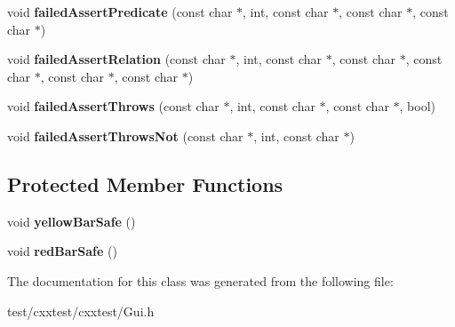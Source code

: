 \begin{DoxyCompactItemize}
\item 
\hypertarget{classCxxTest_1_1GuiListener_ae68ce2f54c5b8f8b9e548ecbebd88e51}{void {\bfseries failed\-Assert\-Predicate} (const char $\ast$, int, const char $\ast$, const char $\ast$, const char $\ast$)}\label{classCxxTest_1_1GuiListener_ae68ce2f54c5b8f8b9e548ecbebd88e51}

\item 
\hypertarget{classCxxTest_1_1GuiListener_a30513fcee80826f4473c5c1bac4d349a}{void {\bfseries failed\-Assert\-Relation} (const char $\ast$, int, const char $\ast$, const char $\ast$, const char $\ast$, const char $\ast$, const char $\ast$)}\label{classCxxTest_1_1GuiListener_a30513fcee80826f4473c5c1bac4d349a}

\item 
\hypertarget{classCxxTest_1_1GuiListener_afb33d69bf7bfed47e7ca30eac1d7485b}{void {\bfseries failed\-Assert\-Throws} (const char $\ast$, int, const char $\ast$, const char $\ast$, bool)}\label{classCxxTest_1_1GuiListener_afb33d69bf7bfed47e7ca30eac1d7485b}

\item 
\hypertarget{classCxxTest_1_1GuiListener_ac70bc31660b653e8d8557ba9febbf5d2}{void {\bfseries failed\-Assert\-Throws\-Not} (const char $\ast$, int, const char $\ast$)}\label{classCxxTest_1_1GuiListener_ac70bc31660b653e8d8557ba9febbf5d2}

\end{DoxyCompactItemize}
\subsection*{Protected Member Functions}
\begin{DoxyCompactItemize}
\item 
\hypertarget{classCxxTest_1_1GuiListener_aa4ca06d3a9cf402fa01c51c4366c1b24}{void {\bfseries yellow\-Bar\-Safe} ()}\label{classCxxTest_1_1GuiListener_aa4ca06d3a9cf402fa01c51c4366c1b24}

\item 
\hypertarget{classCxxTest_1_1GuiListener_a1ef08c9cf0c21041ff9a024731ec68ca}{void {\bfseries red\-Bar\-Safe} ()}\label{classCxxTest_1_1GuiListener_a1ef08c9cf0c21041ff9a024731ec68ca}

\end{DoxyCompactItemize}


The documentation for this class was generated from the following file\-:\begin{DoxyCompactItemize}
\item 
test/cxxtest/cxxtest/Gui.\-h\end{DoxyCompactItemize}
